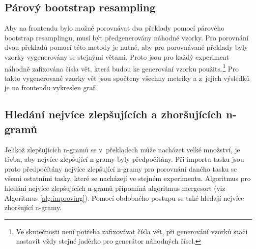 \subsection{Párový bootstrap resampling}
\label{chap:bootstrap-resampling}
Aby na frontendu bylo možné porovnávat dva překlady pomocí párového bootstrap resamplingu,
  musí být předgenerovány náhodné vzorky.
Pro porovnání dvou překladů pomocí této metody je nutné,
  aby pro porovnávané překlady byly vzorky vygenerovány se stejnými větami.
Proto jsou pro každý experiment náhodně zafixována čísla vět,
  která budou ke generování vzorku použita.\footnote{
	Ve skutečnosti není potřeba zafixovávat čísla vět,
	při generování vzorků stačí nastavit vždy stejné jadérko pro generátor náhodných čísel.
  }
Pro takto vygenerované vzorky vět jsou spočteny všechny metriky a
  z~jejich výsledků je na frontendu vykreslen graf.

\subsection{Hledání nejvíce zlepšujících a zhoršujících \mbox{n-gramů}}
\label{chap:improving-worsening}
Jelikož zlepšujících \mbox{n-gramů} se v~překladech může nacházet velké množství,
  je třeba, aby nejvíce zlepšující \mbox{n-gramy} byly předpočítány.
Při importu tasku jsou proto předpočítány nejvíce zlepšující \mbox{n-gramy} pro porovnání daného tasku se všemi ostatními tasky,
  které se nacházejí ve stejném experimentu.
Algoritmus pro hledání nejvíce zlepšujících \mbox{n-gramů} připomíná algoritmus mergesort (viz Algoritmus \ref{alg:improving}).
Pomocí obdobného postupu se také hledají nejvíce zhoršující \mbox{n-gramy}.

